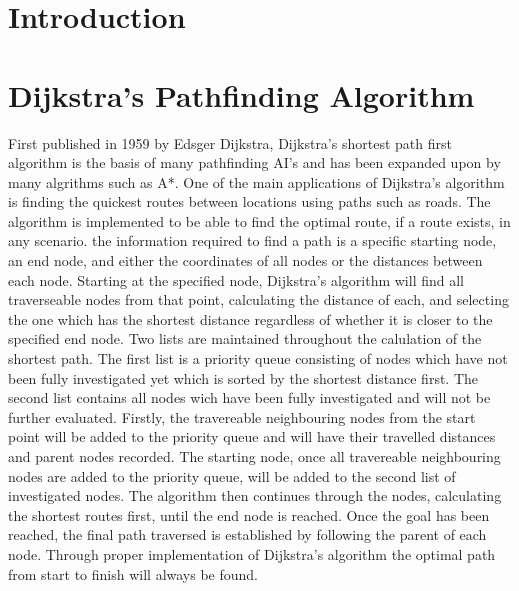 \documentclass[10pt, a4paper]{article}
\title{\mytitle}
\author{\myauthor\hspace{1em}\\\contact\\Edinburgh Napier University\hspace{0.5em}-\hspace{0.5em}\mymodule}
\date{}
\begin{document}
    \maketitle


\section{Introduction}


\section{Dijkstra's Pathfinding Algorithm}
First published in 1959 by Edsger Dijkstra, Dijkstra's shortest path first algorithm is the basis of many pathfinding AI's and has been expanded upon by many algrithms such as A*. One of the main applications of Dijkstra's algorithm is finding the quickest routes between locations using paths such as roads. The algorithm is implemented to be able to find the optimal route, if a route exists, in any scenario. the information required to find a path is a specific starting node, an end node, and either the coordinates of all nodes or the distances between each node. Starting at the specified node, Dijkstra's algorithm will find all traverseable nodes from that point, calculating the distance of each, and selecting the one which has the shortest distance regardless of whether it is closer to the specified end node. Two lists are maintained throughout the calulation of the shortest path. The first list is a priority queue consisting of nodes which have not been fully investigated yet which is sorted by the shortest distance first. The second list contains all nodes wich have been fully investigated and will not be further evaluated. Firstly, the travereable neighbouring nodes from the start point will be added to the priority queue and will have their travelled distances and parent nodes recorded. The starting node, once all travereable neighbouring nodes are added to the priority queue, will be added to the second list of investigated nodes. The algorithm then continues through the nodes, calculating the shortest routes first, until the end node is reached. Once the goal has been reached, the final path traversed is established by following the parent of each node. Through proper implementation of Dijkstra's algorithm the optimal path from start to finish will always be found.
\end{document}
